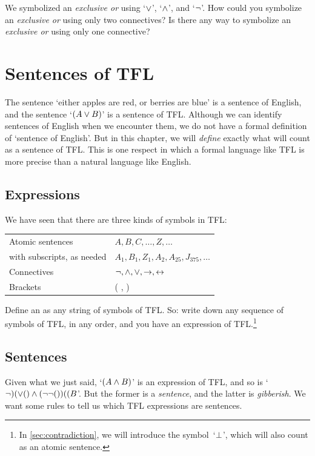 \problempart
We symbolized an \emph{exclusive or} using `$\vee$', `$\wedge$', and `$\neg$'. How could you symbolize an \emph{exclusive or} using only two connectives? Is there any way to symbolize an \emph{exclusive or} using only one connective?


\chapter{Sentences of TFL}\label{s:TFLSentences}
The sentence `either apples are red, or berries are blue' is a sentence of English, and the sentence `$(A\vee B)$' is a sentence of TFL. Although we can identify sentences of English when we encounter them, we do not have a formal definition of `sentence of English'. But in this chapter, we will \emph{define} exactly what will count as a sentence of TFL. This is one respect in which a formal language like TFL is more precise than a natural language like English.


\section{Expressions}

We have seen that there are three kinds of symbols in TFL:
\begin{center}
\begin{tabular}{l l}
Atomic sentences & $A,B,C,\ldots,Z,\ldots$\\
with subscripts, as needed & $A_1, B_1,Z_1,A_2,A_{25},J_{375},\ldots$\\[12pt]
Connectives & $\neg,\wedge,\vee,\rightarrow,\leftrightarrow$\\[12pt]
Brackets &( , )
\end{tabular}
\end{center}
Define an  as any string of symbols of TFL.
So: write down any sequence of symbols of TFL, in any order, and you
have an expression of TFL.\footnote{In \cref{sec:contradiction}, we
will introduce the symbol~`$\bot$', which will also count as an
atomic sentence.}

\section{Sentences}\label{s:Sentences}
Given what we just said, `$(A \wedge B)$' is an expression of TFL, and so is `$\lnot)(\vee()\wedge(\neg\neg())((B$'. But the former is a \emph{sentence}, and the latter is \emph{gibberish}. We want some rules to tell us which TFL expressions are sentences.

